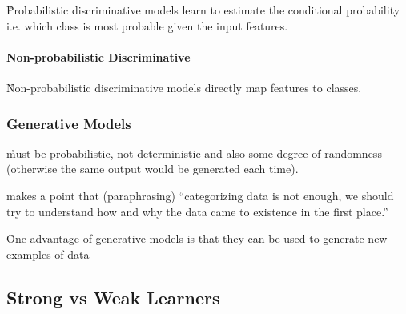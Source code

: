 \r{Probabilistic discriminative models learn to estimate the conditional probability i.e. which class is most probable given the input features.}

\paragraph{Non-probabilistic Discriminative}

\r{Non-probabilistic discriminative models directly map features to classes.}

\subsubsection{Generative Models}


\r{must be probabilistic, not deterministic and also some degree of randomness (otherwise the same output would be generated each time).}




\r{ makes a point that (paraphrasing) ``categorizing data is not enough, we should try to understand how and why the data came to existence in the first place.''}


\r{One advantage of generative models is that they can be used to generate new examples of data}

\subsection{Strong vs Weak Learners}



